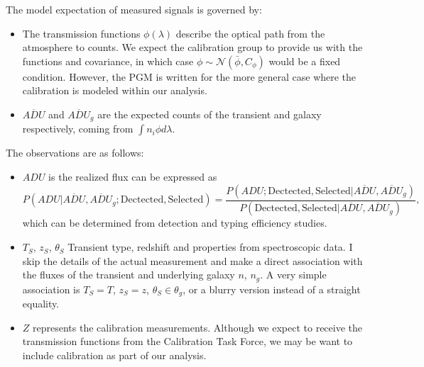 \documentclass[preprint]{aastex}
\begin{document}
The model expectation of measured  signals is governed by:
\begin{itemize}
\item The transmission functions $\phi(\lambda)$ describe the optical path from the
atmosphere to counts.  We expect
the calibration group to provide us with the functions and covariance,
in which case
$\phi \sim \mathcal{N}(\bar{\phi},C_\phi)$ would be a fixed condition.
However, the PGM is written for the more general case where the calibration
is modeled within our analysis.
\item $\overline{\mathit{ADU}}$ and
$\overline{\mathit{ADU}}_g$ are the expected counts of the transient and galaxy respectively,
coming from $\int n_i \phi d\lambda$.
\end{itemize}

The observations are as follows:
\begin{itemize}
\item ${\mathit{ADU}}$ is the realized flux can be expressed as
\begin{equation}
P({\mathit{ADU}} | \overline{\mathit{ADU}}, 
\overline{\mathit{ADU}}_g; \text{Dectected}, \text{Selected})=\frac{P({\mathit{ADU}};\text{Dectected}, \text{Selected} |  
\overline{\mathit{ADU}}, \overline{\mathit{ADU}}_g)}{P(\text{Dectected}, \text{Selected} | 
\overline{\mathit{ADU}},  \overline{{\mathit{ADU}}}_g)},
\end{equation}
which can be determined from detection and typing efficiency studies.
\item ${T}_S$, ${z}_S$, ${\theta}_S$ Transient type, redshift and properties from
spectroscopic data. I skip the details of the actual measurement  and make a direct association
with the fluxes of the transient and underlying galaxy $n$, $n_g$.
A very simple association is ${T}_S = T$, ${z}_S=z$, ${\theta}_S \in \theta_g$,
or a blurry version instead of a straight equality.
\item ${Z}$ represents the calibration measurements.  Although we expect to receive
the transmission functions from the Calibration Task Force, we may be want to include
calibration as part of our analysis.
\end{itemize}
\end{document}
